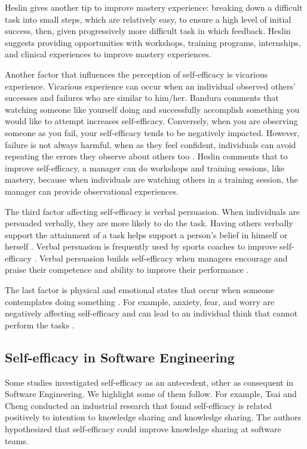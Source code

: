 \documentclass[10pt, conference]{IEEEtran}
\begin{document}
Heslin \cite{heslin1999boosting} gives another tip to improve mastery experience: breaking down a difficult task into small steps, which are relatively easy, to ensure a high level of initial success, then, given progressively more difficult task in which feedback. Heslin suggests providing opportunities with workshops, training programs, internships, and clinical experiences to improve mastery experiences. 


 Another factor that influences the perception of self-efficacy is vicarious experience. Vicarious experience can occur when an individual observed others' successes and failures who are similar to him/her. Bandura \cite{bandura1977self} comments that watching someone like yourself doing and successfully accomplish something you would like to attempt increases self-efficacy. Conversely, when you are observing someone as you fail, your self-efficacy tends to be negatively impacted. However, failure is not always harmful, when as they feel confident, individuals can avoid repeating the errors they observe about others too \cite{brown2013self}. 
 Heslin \cite{heslin1999boosting} comments that to improve self-efficacy, a manager can do workshops and training sessions, like mastery, because when individuals are watching others in a training session, the manager can provide observational experiences.
 
 
 The third factor affecting self-efficacy is verbal persuasion. When individuals are persuaded verbally, they are more likely to do the task. Having others verbally support the attainment of a task helps support a person's belief in himself or herself \cite{bandura1977self}. Verbal persuasion is frequently used by sports coaches to improve self-efficacy \cite{brown2013self}. Verbal persuasion builds self-efficacy when managers encourage and praise their competence and ability to improve their performance \cite{heslin1999boosting}. 
 
The last factor is physical and emotional states that occur when someone contemplates doing something \cite{bandura1977self}. For example, anxiety, fear, and worry are negatively affecting self-efficacy and can lead to an individual think that cannot perform the tasks \cite{pajares1996self}.


\subsection{Self-efficacy in Software Engineering}
Some studies investigated self-efficacy as an antecedent, other as consequent in Software Engineering. We highlight some of them follow. For example, Tsai and Cheng \cite{tsai2010programmer} conducted an industrial research that found self-efficacy is related positively to intention to knowledge sharing and knowledge sharing. The authors hypothesized that self-efficacy could improve knowledge sharing at software teams.
\end{document}
